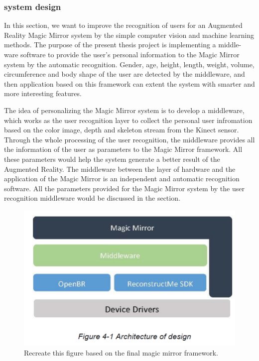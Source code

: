 \subsubsection{system design}
In this section, we want to improve the recognition of users for an Augmented Reality Magic Mirror system by the simple computer vision and machine learning methods. The purpose of the present thesis project is implementing a middle-ware software to provide the user's personal information to the Magic Mirror system by the automatic recognition. Gender, age, height, length, weight, volume, circumference and body shape of the user are detected by the middleware, and then application based on this framework can extent the system with smarter and more interesting features. 

The idea of personalizing the Magic Mirror system is to develop a middleware, which works as the user recognition layer to collect the personal user infromation  based on the color image, depth and skeleton stream from the Kinect sensor. Through the whole processing of the user recognition, the middleware provides all the information of the user as parameters to the Magic Mirror framework. All these parameters would help the system generate a better result of the Augmented Reality. The middleware between the layer of hardware and the application of the Magic Mirror is an independent and automatic recognition software. All the parameters provided for the Magic Mirror system by the user recognition middleware would be discussed in the section.
\begin{figure}
	\centering
	\includegraphics[width=0.7\linewidth]{figures/3-PRMM/middlewareFramework.png}
	\caption{Recreate this figure based on the final magic mirror framework.}
	\label{fig:3-PRMM:middlewareFramework}
\end{figure}

